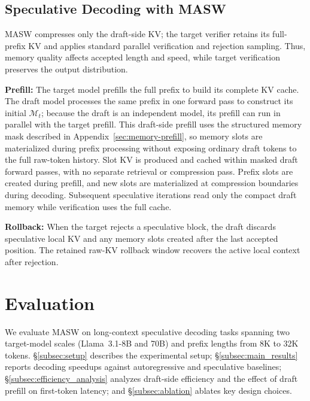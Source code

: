 \subsection{Speculative Decoding with MASW}
\label{subsec:sd_with_masw}

MASW compresses only the draft-side KV; the target verifier retains its full-prefix KV and applies standard parallel verification and rejection sampling.
Thus, memory quality affects accepted length and speed, while target verification preserves the output distribution.

\textbf{Prefill:}
The target model prefills the full prefix to build its complete KV cache.
The draft model processes the same prefix in one forward pass to construct its initial $\mathcal{M}_t$; because the draft is an independent model, its prefill can run in parallel with the target prefill.
This draft-side prefill uses the structured memory mask described in Appendix~\ref{sec:memory-prefill}, so memory slots are materialized during prefix processing without exposing ordinary draft tokens to the full raw-token history.
Slot KV is produced and cached within masked draft forward passes, with no separate retrieval or compression pass.
Prefix slots are created during prefill, and new slots are materialized at compression boundaries during decoding.
Subsequent speculative iterations read only the compact draft memory while verification uses the full cache.

\textbf{Rollback:}
When the target rejects a speculative block, the draft discards speculative local KV and any memory slots created after the last accepted position.
The retained raw-KV rollback window recovers the active local context after rejection.

\section{Evaluation}

We evaluate MASW on long-context speculative decoding tasks spanning two target-model scales (Llama~3.1-8B and 70B) and prefix lengths from 8K to 32K tokens.
\S\ref{subsec:setup} describes the experimental setup; \S\ref{subsec:main_results} reports decoding speedups against autoregressive and speculative baselines; \S\ref{subsec:efficiency_analysis} analyzes draft-side efficiency and the effect of draft prefill on first-token latency; and \S\ref{subsec:ablation} ablates key design choices.

